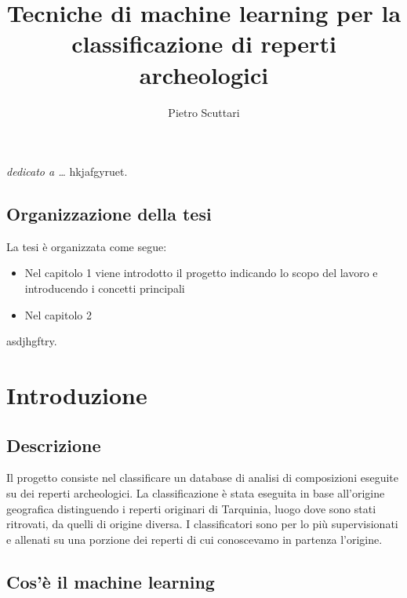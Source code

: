 \documentclass[a4paper,12pt]{report}
\begin{document}
\title{Tecniche di machine learning per la classificazione di reperti archeologici}
\author{Pietro Scuttari}
%
% 
%
\beforepreface
\prefacesection{}
		{\hfill \Large {\sl dedicato a \dots}}
% 
%
hkjafgyruet.
%
%
\section{Organizzazione della tesi}
\label{organizzazione}
La tesi \`e organizzata come segue:
\begin{itemize}
	\item Nel capitolo 1 viene introdotto il progetto indicando lo scopo del lavoro e 
introducendo i concetti principali
	\item Nel capitolo 2 

\end{itemize}
%
%
asdjhgftry.
\afterpreface
% 
% 
\chapter{Introduzione}
\label{cap1}
\section{Descrizione}
Il progetto consiste nel classificare un database di analisi di composizioni eseguite
su dei reperti archeologici. La classificazione è stata eseguita in base all'origine
geografica distinguendo i reperti originari di Tarquinia, luogo dove sono stati %
ritrovati, da quelli di origine diversa. I classificatori sono per lo più 
supervisionati e allenati su una porzione dei reperti di cui conoscevamo in partenza
l'origine.
\section{Cos'è il machine learning}
\end{document}
